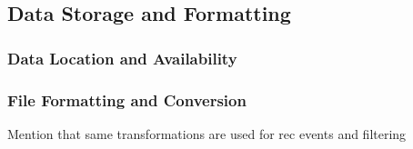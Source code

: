 \subsection{Data Storage and Formatting}
    \subsubsection{Data Location and Availability}
    \subsubsection{File Formatting and Conversion}\label{sec:filtering}
        Mention that same transformations are used for rec events and filtering
    
